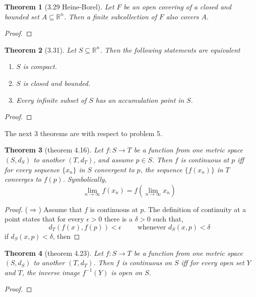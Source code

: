 \documentclass[aps,pra,notitlepage,amsmath,amssymb,letterpaper,12pt]{revtex4-1}
\newtheorem{theorem}{Theorem}
\begin{document}
\begin{theorem}[3.29 Heine-Borel]
Let $F$ be an open covering of a closed and bounded set $A \subseteq \mathbb{R}^n$. Then a finite subcollection of $F$ also covers $A$.
\end{theorem}

\begin{proof}
\end{proof}


\begin{theorem}[3.31]
Let $S \subseteq \mathbb{R}^n$. Then the following statements are equivalent
\begin{enumerate}[\upshape a)]
  \item $S$ is compact. %
  \item $S$ is closed and bounded.
  \item Every infinite subset of $S$ has an accumulation point in $S$.
\end{enumerate}
\end{theorem}

\begin{proof}
\end{proof}


The next 3 theorems are with respect to problem 5.
\begin{theorem}[theorem 4.16]
Let $f:S \to T$  be a function from one metric space $(S,d_{S})$ to another $(T,d_{T})$, and assume $p \in S$. Then $f$ is continuous at $p$ iff for every sequence $\{x_{n}\}$ in $S$ convergent to $p$, the sequence $\{f(x_{n})\}$ in $T$ converges to $f(p)$. Symbolically,
\[\lim_{n \to \infty} f(x_{n}) = f(\lim_{n \to \infty} x_{n})\]
\end{theorem}
\begin{proof}
($\Longrightarrow$) Assume that $f$ is continuous at $p$. The definition of continuity at a point states that for every $\epsilon > 0$ there is a $\delta >0$ such that,
\[d_{T}(f(x),f(p)) < \epsilon \qquad \textrm{  whenever  } d_{S}(x,p) < \delta\]
if $d_{S}(x,p) < \delta$, then 
\end{proof}

\begin{theorem}[theorem 4.23]
Let $f:S \to T$  be a function from one metric space $(S,d_{S})$ to another $(T,d_{T})$. Then $f$ is continuous on $S$ iff for every open set $Y$ and $T$, the inverse image $f^{-1}(Y)$ is open on $S$.
\end{theorem}
\begin{proof}
\end{proof}
\end{document}
